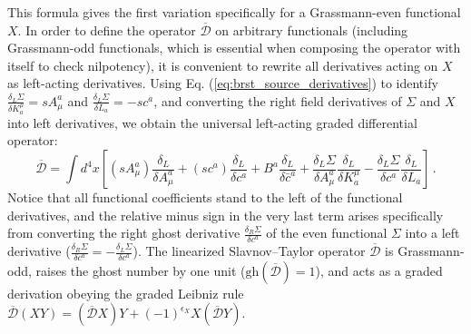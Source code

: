 This formula gives the first variation specifically for a Grassmann-even functional \(X\). In order to define the operator \(\overline{\mathcal{D}}\) on arbitrary functionals (including Grassmann-odd functionals, which is essential when composing the operator with itself to check nilpotency), it is convenient to rewrite all derivatives acting on \(X\) as left-acting derivatives. Using Eq. (\ref{eq:brst_source_derivatives}) to identify \(\frac{\delta_L \Sigma}{\delta K_a^\mu} = sA_\mu^a\) and \(\frac{\delta_L \Sigma}{\delta L_a} = -sc^a\), and converting the right field derivatives of \(\Sigma\) and \(X\) into left derivatives, we obtain the universal left-acting graded differential operator:
\begin{equation} \label{eq:d_bar_universal_operator}
    \overline{\mathcal{D}} = \int d^4x \left[ (sA_\mu^a) \frac{\delta_L}{\delta A_\mu^a} + (sc^a) \frac{\delta_L}{\delta c^a} + B^a \frac{\delta_L}{\delta \bar{c}^a} + \frac{\delta_L \Sigma}{\delta A_\mu^a} \frac{\delta_L}{\delta K_a^\mu} - \frac{\delta_L \Sigma}{\delta c^a} \frac{\delta_L}{\delta L_a} \right] \, .
\end{equation}
Notice that all functional coefficients stand to the left of the functional derivatives, and the relative minus sign in the very last term arises specifically from converting the right ghost derivative \(\frac{\delta_R \Sigma}{\delta c^a}\) of the even functional \(\Sigma\) into a left derivative (\(\frac{\delta_R \Sigma}{\delta c^a} = -\frac{\delta_L \Sigma}{\delta c^a}\)). The linearized Slavnov--Taylor operator \(\overline{\mathcal{D}}\) is Grassmann-odd, raises the ghost number by one unit (\(\text{gh}(\overline{\mathcal{D}}) = 1\)), and acts as a graded derivation obeying the graded Leibniz rule \(\overline{\mathcal{D}}(XY) = (\overline{\mathcal{D}}X)Y + (-1)^{\epsilon_X} X(\overline{\mathcal{D}}Y)\).

